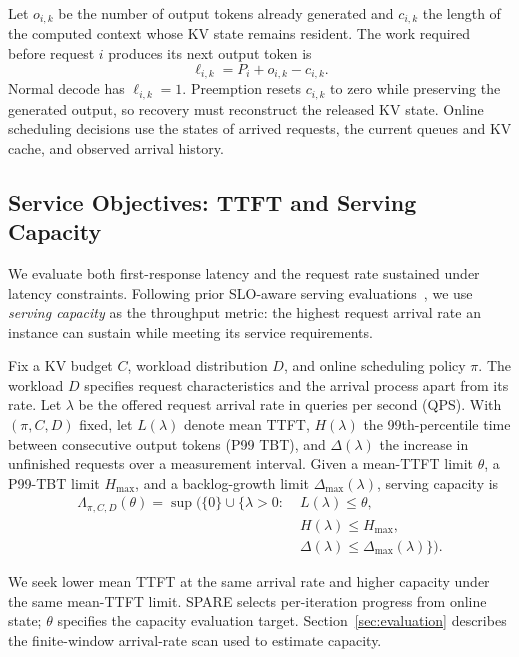 \documentclass[sigconf,anonymous,review]{acmart}
\begin{document}
Let $o_{i,k}$ be the number of output tokens already generated and $c_{i,k}$ the length of the computed context whose KV state remains resident. The work required before request $i$ produces its next output token is
\begin{equation}
    \ell_{i,k}=P_i+o_{i,k}-c_{i,k}.
    \label{eq:remaining-work}
\end{equation}
Normal decode has $\ell_{i,k}=1$. Preemption resets $c_{i,k}$ to zero while preserving the generated output, so recovery must reconstruct the released KV state. Online scheduling decisions use the states of arrived requests, the current queues and KV cache, and observed arrival history.

\subsection{Service Objectives: TTFT and Serving Capacity}
\label{sec:service-objectives}

We evaluate both first-response latency and the request rate sustained under latency constraints. Following prior SLO-aware serving evaluations~\cite{intro_sarathi,zhong2024distserve,patel2024splitwise}, we use \emph{serving capacity} as the throughput metric: the highest request arrival rate an instance can sustain while meeting its service requirements.

Fix a KV budget $C$, workload distribution $D$, and online scheduling policy $\pi$. The workload $D$ specifies request characteristics and the arrival process apart from its rate. Let $\lambda$ be the offered request arrival rate in queries per second (QPS). With $(\pi,C,D)$ fixed, let $L(\lambda)$ denote mean TTFT, $H(\lambda)$ the 99th-percentile time between consecutive output tokens (P99 TBT), and $\Delta(\lambda)$ the increase in unfinished requests over a measurement interval. Given a mean-TTFT limit $\theta$, a P99-TBT limit $H_{\max}$, and a backlog-growth limit $\Delta_{\max}(\lambda)$, serving capacity is
\begin{equation}
\begin{aligned}
\Lambda_{\pi,C,D}(\theta)=\sup\bigl(\{0\}\cup\{\lambda>0:\;
    &L(\lambda)\le\theta,\\
    &H(\lambda)\le H_{\max},\\
    &\Delta(\lambda)\le\Delta_{\max}(\lambda)\}\bigr).
\end{aligned}
\label{eq:serving-capacity}
\end{equation}

We seek lower mean TTFT at the same arrival rate and higher capacity under the same mean-TTFT limit. SPARE selects per-iteration progress from online state; $\theta$ specifies the capacity evaluation target. Section~\ref{sec:evaluation} describes the finite-window arrival-rate scan used to estimate capacity.
\end{document}
